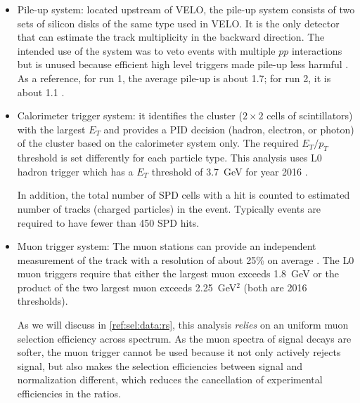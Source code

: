 \begin{itemize}
    \item Pile-up system:
        located upstream of VELO, the pile-up system consists of two sets of
        silicon disks of the same type used in VELO.
        It is the only detector that can estimate the track multiplicity
        in the backward direction.
        The intended use of the system was to veto events with multiple $pp$
        interactions but is unused because efficient high level triggers
        made pile-up less harmful \cite{Oggero:1635658}.
        As a reference, for run 1, the average pile-up is about 1.7;
        for run 2, it is about 1.1
        \cite{d_Argent_2017}.

    \item Calorimeter trigger system:
        it identifies the cluster
        ($2 \times 2$ cells of scintillators) with the largest
        $E_T$ and provides a PID decision (hadron, electron, or photon) of the
        cluster based on the calorimeter system only.
        The required $E_T / p_T$ threshold is set differently
        for each particle type.
        This analysis uses L0 hadron trigger which has a $E_T$ threshold
        of 3.7~GeV for year 2016 \cite{LHCb-DP-2019-001}.

        In addition, the total number of SPD cells with a hit is counted to
        estimated number of tracks (charged particles) in the event.
        Typically events are required to have fewer than 450 SPD hits.

    \item Muon trigger system:
        The muon stations can provide an independent measurement of the track
        \pt with a resolution of about 25\% on average
        \cite{LHCb-DP-2019-001}.
        The L0 muon triggers require that either the largest muon \pt exceeds
        1.8~GeV or the product of the two largest muon \pt exceeds 2.25~GeV$^2$
        (both are 2016 thresholds).

        As we will discuss in \cref{ref:sel:data:rs},
        this analysis \emph{relies} on an uniform muon selection efficiency
        across \pt spectrum.
        As the muon \pt spectra of signal decays are softer,
        the muon trigger cannot be used because it not only actively
        rejects signal, but also makes the selection efficiencies between signal
        and normalization different,
        which reduces the cancellation of experimental efficiencies
        in the \RDX ratios.
\end{itemize}

